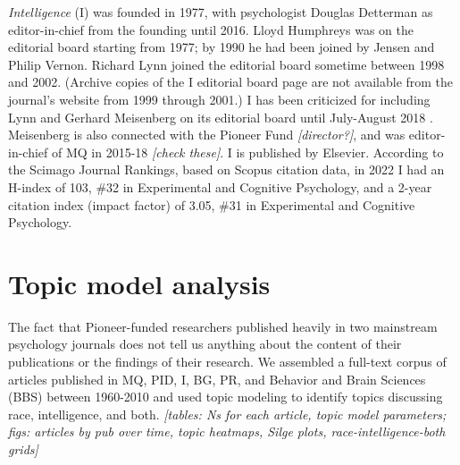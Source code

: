 \documentclass[12pt]{article}
\begin{document}
\emph{Intelligence} (I) was founded in 1977, with psychologist Douglas Detterman as editor-in-chief from the founding until 2016. Lloyd Humphreys was on the editorial board starting from 1977; by 1990 he had been joined by Jensen and Philip Vernon. Richard Lynn joined the editorial board sometime between 1998 and 2002. (Archive copies of the I editorial board page are not available from the journal's website from 1999 through 2001.) I has been criticized for including Lynn and Gerhard Meisenberg on its editorial board until July-August 2018 \cite{SainiSuperiorReturnRace2019}. Meisenberg is also connected with the Pioneer Fund \emph{{[}director?{]}}, and was editor-in-chief of MQ in 2015-18 \emph{{[}check these{]}}. I is published by Elsevier. According to the Scimago Journal Rankings, based on Scopus citation data, in 2022 I had an H-index of 103, \#32 in Experimental and Cognitive Psychology, and a 2-year citation index (impact factor) of 3.05, \#31 in Experimental and Cognitive Psychology.

\hypertarget{topic-model-analysis}{%
\section*{Topic model analysis}\label{topic-model-analysis}}

The fact that Pioneer-funded researchers published heavily in two mainstream psychology journals does not tell us anything about the content of their publications or the findings of their research. We assembled a full-text corpus of articles published in MQ, PID, I, BG, PR, and Behavior and Brain Sciences (BBS) between 1960-2010 and used topic modeling to identify topics discussing race, intelligence, and both. \emph{{[}tables: Ns for each article, topic model parameters; figs: articles by pub over time, topic heatmaps, Silge plots, race-intelligence-both grids{]}}
\end{document}
